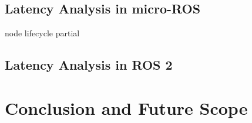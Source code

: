 \documentclass[%
xelatex,
	oneside,		%
	12pt,			%
	parskip=half,	%
	abstracton,
	chapterprefix=true%
    appendixprefix=true]
{scrbook}
\begin{document}
\rofoot[\pagemark]{\pagemark}
		\section{Latency Analysis in micro-ROS}
		node lifecycle partial
		\section{Latency Analysis in ROS 2}
		
		
		\chapter{Conclusion and Future Scope}
			
\rofoot[\pagemark]{\pagemark}
	\listoffigures
	\listoftables
		
		

\end{document}
